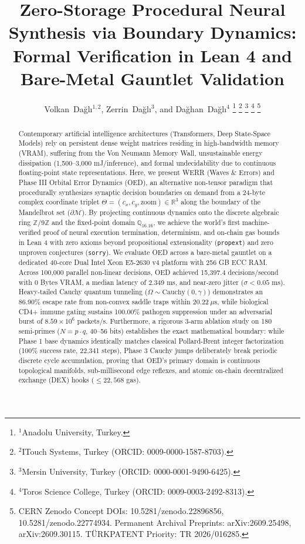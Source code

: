 \documentclass[journal,onecolumn]{IEEEtran}
\title{Zero-Storage Procedural Neural Synthesis via Boundary Dynamics: Formal Verification in Lean 4 and Bare-Metal Gauntlet Validation}
\author{Volkan~Da\u{g}l{\i}$^{1,2}$, %
        Zerrin~Da\u{g}l{\i}$^3$, and %
        Da\u{g}han~Da\u{g}l{\i}$^4$%
\thanks{$^1$Anadolu University, Turkey.}%
\thanks{$^2$ITouch Systems, Turkey (ORCID: 0009-0000-1587-8703).}%
\thanks{$^3$Mersin University, Turkey (ORCID: 0000-0001-9490-6425).}%
\thanks{$^4$Toros Science College, Turkey (ORCID: 0009-0003-2492-8313).}%
\thanks{CERN Zenodo Concept DOIs: 10.5281/zenodo.22896856, 10.5281/zenodo.22774934. Permanent Archival Preprints: arXiv:2609.25498, arXiv:2609.30115. T\"URKPATENT Priority: TR 2026/016285.}%
}
\begin{document}
\maketitle

\begin{abstract}
Contemporary artificial intelligence architectures (Transformers, Deep State-Space Models) rely on persistent dense weight matrices residing in high-bandwidth memory (VRAM), suffering from the Von Neumann Memory Wall, unsustainable energy dissipation (1,500--3,000 mJ/inference), and formal undecidability due to continuous floating-point state representations. Here, we present WERR (Waves \& Errors) and Phase III Orbital Error Dynamics (OED), an alternative non-tensor paradigm that procedurally synthesizes synaptic decision boundaries on demand from a 24-byte complex coordinate triplet $\Theta = (c_x, c_y, \text{zoom}) \in \mathbb{R}^3$ along the boundary of the Mandelbrot set ($\partial \mathcal{M}$). By projecting continuous dynamics onto the discrete algebraic ring $\mathbb{Z}/9\mathbb{Z}$ and the fixed-point domain $\mathbb{Q}_{16.16}$, we achieve the world's first machine-verified proof of neural execution termination, determinism, and on-chain gas bounds in Lean 4 with zero axioms beyond propositional extensionality (\texttt{propext}) and zero unproven conjectures (\texttt{sorry}). We evaluate OED across a bare-metal gauntlet on a dedicated 40-core Dual Intel Xeon E5-2630 v4 platform with 256 GB ECC RAM. Across 100,000 parallel non-linear decisions, OED achieved 15,397.4 decisions/second with 0 Bytes VRAM, a median latency of 2.349 ms, and near-zero jitter ($\sigma < 0.05$ ms). Heavy-tailed Cauchy quantum tunneling ($\Omega \sim \text{Cauchy}(0, \gamma)$) demonstrates an 86.90\% escape rate from non-convex saddle traps within $20.22\ \mu\text{s}$, while biological CD4+ immune gating sustains 100.00\% pathogen suppression under an adversarial burst of $8.59 \times 10^6$ packets/s. Furthermore, a rigorous 3-arm ablation study on 180 semi-primes ($N = p \cdot q$, 40--56 bits) establishes the exact mathematical boundary: while Phase 1 base dynamics identically matches classical Pollard-Brent integer factorization (100\% success rate, 22,341 steps), Phase 3 Cauchy jumps deliberately break periodic discrete cycle accumulation, proving that OED's primary domain is continuous topological manifolds, sub-millisecond edge reflexes, and atomic on-chain decentralized exchange (DEX) hooks ($\le 22,568$ gas).
\end{abstract}
\end{document}
